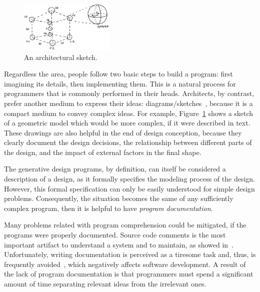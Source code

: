 \begin{figure}
  \vspace{-20pt}
  \begin{center}
    \includegraphics[width=0.4\textwidth]{images/cube-sketch}
  \end{center}
  \vspace{-15pt}
 \caption{An architectural sketch.}  
  \vspace{-20pt}
    \label{fig:sketch}
\end{figure}

Regardless the area, people follow two basic steps to build a program: first imagining its details, then implementing them. This is a natural process for programmers that is commonly performed in their heads. Architects, by contrast, prefer another medium to express their ideas: diagrams/sketches~\citep{do2001thinking}, because it is a compact medium to convey complex ideas. For example, Figure~\ref{fig:sketch} shows a sketch of a geometric model which would be more complex, if it were described in text. These drawings are also helpful in the end of design conception, because they clearly document the design decisions, the relationship between different parts of the design, and the impact of external factors in the final shape.

The generative design programs, by definition, can itself be considered a description of a design, as it formally specifies the modeling process of the design. However, this formal specification can only be easily understood for simple design problems. Consequently, the situation becomes the same of any sufficiently complex program, then it is helpful to have \textit{program documentation}.

Many problems related with program comprehension could be mitigated, if the programs were properly documented. Source code comments is the most important artifact to understand a system and to maintain, as showed in~\citep{de2005study}. Unfortunately, writing documentation is perceived as a tiresome task and, thus, is frequently avoided~\citep{sousa1998survey}, which negatively affects software development. A result of the lack of program documentation is that programmers must spend a significant amount of time separating relevant ideas from the irrelevant ones.

